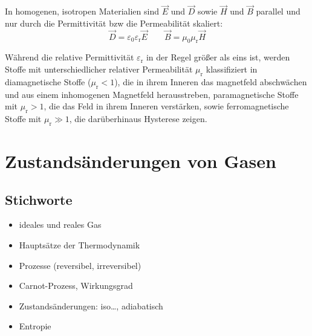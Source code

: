 \documentclass[a4paper]{scrartcl}
\begin{document}
In homogenen, isotropen Materialien sind $\vec E$ und $\vec D$ sowie $\vec H$ und $\vec B$ parallel und nur durch die Permittivität bzw die Permeabilität skaliert:
\begin{equation*}
  \vec D = \varepsilon_0\varepsilon_\text{r} \vec E \qquad \vec B = \mu_0\mu_\text{r} \vec H
\end{equation*}

Während die relative Permittivität $\varepsilon_\text{r}$ in der Regel größer als eins ist, werden Stoffe mit unterschiedlicher relativer Permeabilität $\mu_\text{r}$ klassifiziert in diamagnetische Stoffe ($\mu_\text{r} < 1$), die in ihrem Inneren das magnetfeld abschwächen und aus einem inhomogenen Magnetfeld herausstreben, paramagnetische Stoffe mit $\mu_\text{r}>1$, die das Feld in ihrem Inneren verstärken, sowie ferromagnetische Stoffe mit $\mu_\text{r} \gg 1$, die darüberhinaus Hysterese zeigen.


\section{Zustandsänderungen von Gasen}

\subsection{Stichworte}
\begin{itemize}[noitemsep]
  \item ideales und reales Gas
  \item Hauptsätze der Thermodynamik
  \item Prozesse (reversibel, irreversibel)
  \item Carnot-Prozess, Wirkungsgrad
  \item Zustandsänderungen: iso\dots, adiabatisch
  \item Entropie
\end{itemize}
\end{document}
